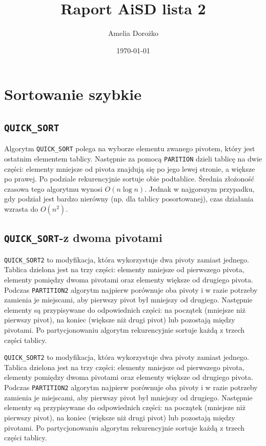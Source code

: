 \documentclass{article}
\begin{document}
	
\title{Raport AiSD lista 2}
\author{Amelia Dorożko}
\date{\today}
\maketitle

	
\section{Sortowanie szybkie}
\subsection{\texttt{QUICK\_SORT}}
Algorytm \texttt{QUICK\_SORT} polega na wyborze elementu zwanego pivotem, który  jest ostatnim elementem tablicy. Następnie za pomocą \texttt{PARITION} dzieli tablicę na dwie części: elementy mniejsze od pivota znajdują się po jego lewej stronie, a większe po prawej. Po podziale  rekurencyjnie sortuje obie podtablice. Średnia złożoność czasowa tego algorytmu wynosi \(O(n \log n)\). Jednak w najgorszym przypadku, gdy podział jest bardzo nierówny (np. dla tablicy posortowanej), czas działania wzrasta do \(O(n^2)\).

\subsection{\texttt{QUICK\_SORT}-z dwoma pivotami}


\texttt{QUICK\_SORT2} to modyfikacja, która wykorzystuje dwa pivoty zamiast jednego. Tablica dzielona jest na trzy części: elementy mniejsze od pierwszego pivota, elementy pomiędzy dwoma pivotami oraz elementy większe od drugiego pivota. Podczas \texttt{PARTITION2} algorytm najpierw porównuje oba pivoty i w razie potrzeby zamienia je miejscami, aby pierwszy pivot był mniejszy od drugiego. Następnie elementy są przypisywane do odpowiednich części: na początek (mniejsze niż pierwszy pivot), na koniec (większe niż drugi pivot) lub pozostają między pivotami. Po partycjonowaniu algorytm rekurencyjnie sortuje każdą z trzech części tablicy.

\texttt{QUICK\_SORT2} to modyfikacja, która wykorzystuje dwa pivoty zamiast jednego. Tablica dzielona jest na trzy części: elementy mniejsze od pierwszego pivota, elementy pomiędzy dwoma pivotami oraz elementy większe od drugiego pivota. Podczas \texttt{PARTITION2} algorytm najpierw porównuje oba pivoty i w razie potrzeby zamienia je miejscami, aby pierwszy pivot był mniejszy od drugiego. Następnie elementy są przypisywane do odpowiednich części: na początek (mniejsze niż pierwszy pivot), na koniec (większe niż drugi pivot) lub pozostają między pivotami. Po partycjonowaniu algorytm rekurencyjnie sortuje każdą z trzech części tablicy.
\end{document}
